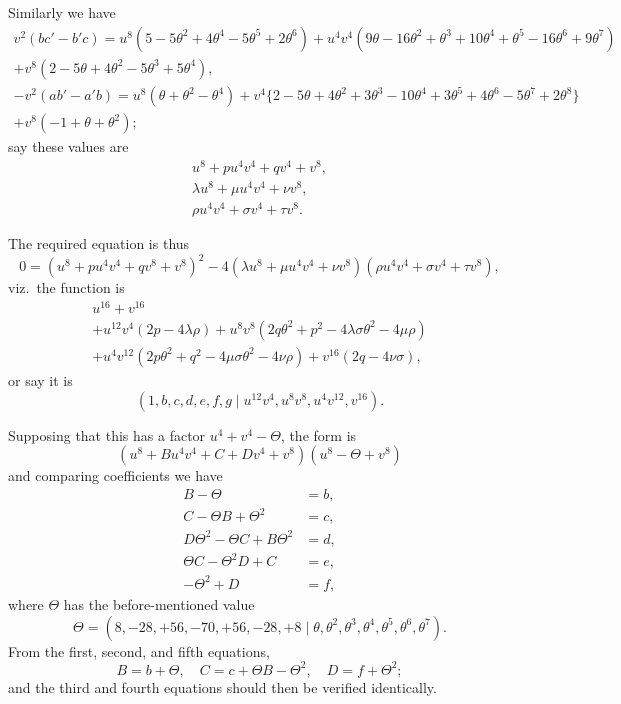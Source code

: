\documentclass[12pt,a4paper]{article}
\begin{document}
Similarly we have
\begin{multline*}
v^2(bc' - b'c) = u^8(5 - 5\theta^2 + 4\theta^4 - 5\theta^5 + 2\theta^6) + u^4 v^4(9\theta - 16\theta^2 + \theta^3 + 10\theta^4 + \theta^5 - 16\theta^6 + 9\theta^7)\\
+ v^8(2 - 5\theta + 4\theta^2 - 5\theta^3 + 5\theta^4),
\end{multline*}
\begin{multline*}
-v^2(ab' - a'b) = u^8(\theta + \theta^2 - \theta^4) + v^4\{2 - 5\theta + 4\theta^2 + 3\theta^3 - 10\theta^4 + 3\theta^5 + 4\theta^6 - 5\theta^7 + 2\theta^8\}\\
+ v^8(-1 + \theta + \theta^2);
\end{multline*}
say these values are
\begin{gather*}
u^8 + pu^4 v^4 + qv^4 + v^8,\\
\lambda u^8 + \mu u^4 v^4 + \nu v^8,\\
\rho u^4 v^4 + \sigma v^4 + \tau v^8.
\end{gather*}

The required equation is thus
\[
0 = (u^8 + pu^4 v^4 + qv^8 + v^8)^2 - 4(\lambda u^8 + \mu u^4 v^4 + \nu v^8)(\rho u^4 v^4 + \sigma v^4 + \tau v^8),
\]
viz.\ the function is
\begin{multline*}
u^{16} + v^{16}\\
+ u^{12}v^4(2p - 4\lambda\rho)
+ u^8 v^8(2q\theta^2 + p^2 - 4\lambda\sigma\theta^2 - 4\mu\rho)\\
+ u^4 v^{12}(2p\theta^2 + q^2 - 4\mu\sigma\theta^2 - 4\nu\rho)
+ v^{16}(2q - 4\nu\sigma),
\end{multline*}
or say it is
\[
(1, b, c, d, e, f, g \mid u^{12}v^4, u^8 v^8, u^4 v^{12}, v^{16}).
\]

\newpage
Supposing that this has a factor $u^4 + v^4 - \Theta$, the form is
\[
(u^8 + Bu^4 v^4 + C + Dv^4 + v^8)(u^8 - \Theta + v^8)
\]
and comparing coefficients we have
\begin{align*}
B - \Theta &= b,\\
C - \Theta B + \Theta^2 &= c,\\
D\Theta^2 - \Theta C + B\Theta^2 &= d,\\
\Theta C - \Theta^2 D + C &= e,\\
-\Theta^2 + D &= f,
\end{align*}
where $\Theta$ has the before-mentioned value
\[
\Theta = (8, -28, +56, -70, +56, -28, +8 \mid \theta, \theta^2, \theta^3, \theta^4, \theta^5, \theta^6, \theta^7).
\]
From the first, second, and fifth equations,
\[
B = b + \Theta,\quad C = c + \Theta B - \Theta^2,\quad D = f + \Theta^2;
\]
and the third and fourth equations should then be verified identically.
\end{document}
